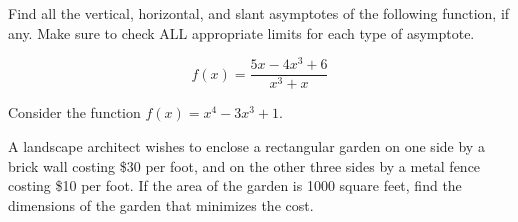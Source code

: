 \documentclass[addpoints,12pt]{exam}
\begin{document}
\begin{questions}




\newpage




\question[6] Find all the vertical, horizontal, and slant asymptotes of the following function, if
any. Make sure to check ALL appropriate limits for each type of asymptote.




$$f(x) = \dfrac{5x -4x^3 +6}{x^3+x}$$




\newpage

\question Consider the function $f(x) = x^4- 3x^3+1. $


\newpage

 \question[12] A landscape architect wishes to enclose a rectangular garden on one side by a
brick wall costing \$30 per foot, and on the other three sides by a metal fence costing \$10 per
foot. If the area of the garden is 1000 square feet, find the dimensions of the garden that
minimizes the cost.


\end{questions}
\end{document}

